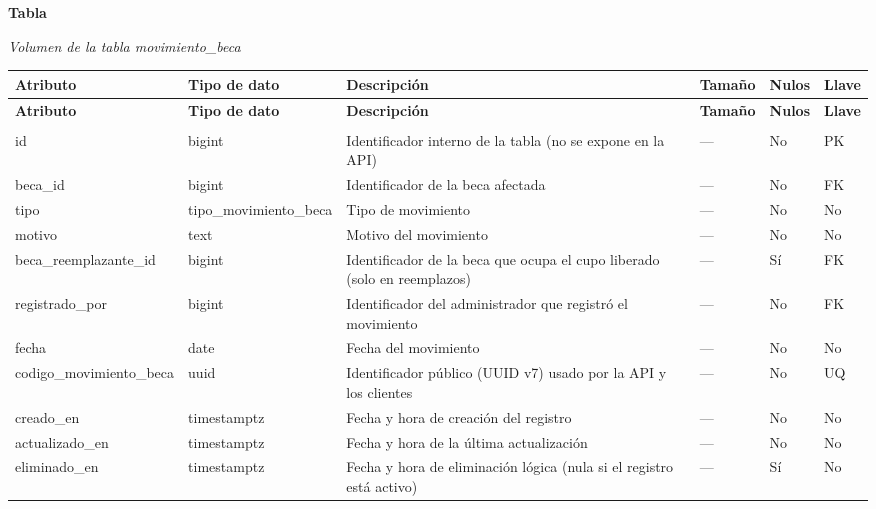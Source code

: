 \label{tab:volumen_movimiento_beca}
\noindent\textbf{Tabla~\thetable}\par\nopagebreak
\noindent\textit{Volumen de la tabla movimiento\_\allowbreak{}beca}\par\nopagebreak
\begingroup\small\linespread{1}\selectfont\setlength{\tabcolsep}{4pt}
\begin{longtable}{>{\raggedright\arraybackslash}p{3.4cm} >{\raggedright\arraybackslash}p{2.5cm} >{\raggedright\arraybackslash}p{4.8cm} >{\centering\arraybackslash}p{1.6cm}>{\centering\arraybackslash}p{1.1cm} >{\centering\arraybackslash}p{1.3cm}}
\toprule
\textbf{Atributo} & \textbf{Tipo de dato} & \textbf{Descripción} & \textbf{Tamaño} & \textbf{Nulos} & \textbf{Llave} \\
\midrule
\endfirsthead
\toprule
\textbf{Atributo} & \textbf{Tipo de dato} & \textbf{Descripción} & \textbf{Tamaño} & \textbf{Nulos} & \textbf{Llave} \\
\midrule
\endhead
\endfoot
\bottomrule
\multicolumn{6}{l}{\textit{Nota.} Elaboración propia.} \\
\endlastfoot
id & bigint & Identificador interno de la tabla (no se expone en la API) & — & No & PK \\
beca\_\allowbreak{}id & bigint & Identificador de la beca afectada & — & No & FK \\
tipo & tipo\_\allowbreak{}movimiento\_\allowbreak{}beca & Tipo de movimiento & — & No & No \\
motivo & text & Motivo del movimiento & — & No & No \\
beca\_\allowbreak{}reemplazante\_\allowbreak{}id & bigint & Identificador de la beca que ocupa el cupo liberado (solo en reemplazos) & — & Sí & FK \\
registrado\_\allowbreak{}por & bigint & Identificador del administrador que registró el movimiento & — & No & FK \\
fecha & date & Fecha del movimiento & — & No & No \\
codigo\_\allowbreak{}movimiento\_\allowbreak{}beca & uuid & Identificador público (UUID v7) usado por la API y los clientes & — & No & UQ \\
creado\_\allowbreak{}en & timestamptz & Fecha y hora de creación del registro & — & No & No \\
actualizado\_\allowbreak{}en & timestamptz & Fecha y hora de la última actualización & — & No & No \\
eliminado\_\allowbreak{}en & timestamptz & Fecha y hora de eliminación lógica (nula si el registro está activo) & — & Sí & No \\
\end{longtable}
\endgroup
\addtocounter{table}{-1}

